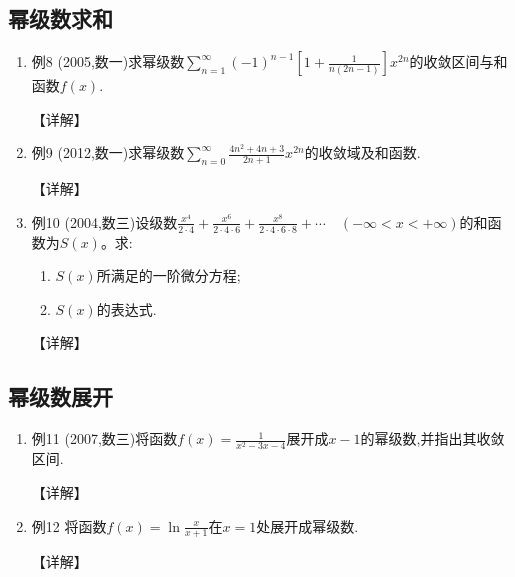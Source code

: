 \documentclass[12pt, a4paper, oneside, UTF8]{ctexbook}
\begin{document}
\subsection{幂级数求和}

\begin{enumerate}[label=\arabic*.,start=8]
    \item 例8 (2005,数一)求幂级数$\sum_{n=1}^{\infty}(-1)^{n-1}\left[1+\frac{1}{n(2n-1)}\right] x^{2n}$的收敛区间与和函数$f(x)$.
    
    \begin{solution}
    【详解】
    \end{solution}
    
    \item 例9 (2012,数一)求幂级数$\sum_{n=0}^{\infty}\frac{4n^2+4n+3}{2n+1} x^{2n}$的收敛域及和函数.
    
    \begin{solution}
    【详解】
    \end{solution}
    
    \item 例10 (2004,数三)设级数$\frac{x^4}{2\cdot 4}+\frac{x^6}{2\cdot 4\cdot 6}+\frac{x^8}{2\cdot 4\cdot 6\cdot 8}+\cdots\quad(-\infty<x<+\infty)$的和函数为$S(x)$。求:
    \begin{enumerate}[label=(\roman*)]
        \item $S(x)$所满足的一阶微分方程;
        \item $S(x)$的表达式.
    \end{enumerate}
    
    \begin{solution}
    【详解】
    \end{solution}
\end{enumerate}

\subsection{幂级数展开}

\begin{enumerate}[label=\arabic*.,start=11]
    \item 例11 (2007,数三)将函数$f(x)=\frac{1}{x^2-3x-4}$展开成$x-1$的幂级数,并指出其收敛区间.
    
    \begin{solution}
    【详解】
    \end{solution}
    
    \item 例12 将函数$f(x)=\ln\frac{x}{x+1}$在$x=1$处展开成幂级数.
    
    \begin{solution}
    【详解】
    \end{solution}
\end{enumerate}
\end{document}

